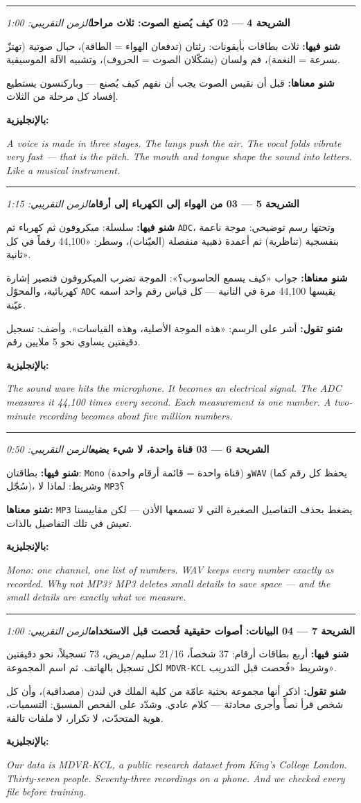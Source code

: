 \documentclass[12pt,a4paper]{article}
\newcommand{\E}[1]{\textenglish{\texttt{#1}}}
\newcommand{\N}[1]{\textenglish{#1}}
\newcommand{\slayd}[3]{%
  \par\vspace{10pt}\hrule\vspace{8pt}%
  {\large\textbf{الشريحة #1 — #2}}\hfill{\small\textit{الزمن التقريبي: #3}}\par\vspace{4pt}%
}
\newcommand{\fiha}{\textbf{شنو فيها: }}
\newcommand{\managementhaha}{\textbf{شنو معناها: }}
\newcommand{\tqul}{\textbf{شنو تقول: }}
\newcommand{\bilinglizi}[1]{\par\textbf{بالإنجليزية:}\par
  \begin{english}\small\itshape #1\end{english}\par}
\begin{document}
\slayd{\N{4}}{\N{02} كيف يُصنع الصوت: ثلاث مراحل}{\N{1:00}}
\fiha ثلاث بطاقات بأيقونات: رئتان (تدفعان الهواء = الطاقة)، حبال صوتية
(تهتزّ بسرعة = النغمة)، فم ولسان (يشكّلان الصوت = الحروف)، وتشبيه الآلة
الموسيقية.
\par\managementhaha قبل أن نقيس الصوت يجب أن نفهم كيف يُصنع — وباركنسون
يستطيع إفساد كل مرحلة من الثلاث.
\bilinglizi{A voice is made in three stages. The lungs push the air. The
vocal folds vibrate very fast --- that is the pitch. The mouth and
tongue shape the sound into letters. Like a musical instrument.}

\slayd{\N{5}}{\N{03} من الهواء إلى الكهرباء إلى أرقام}{\N{1:15}}
\fiha سلسلة: ميكروفون ثم كهرباء ثم \E{ADC}، وتحتها رسم توضيحي: موجة
ناعمة بنفسجية (تناظرية) ثم أعمدة ذهبية منفصلة (العيّنات)، وسطر:
«\N{44{,}100} رقماً في كل ثانية».
\par\managementhaha جواب «كيف يسمع الحاسوب؟»: الموجة تضرب الميكروفون
فتصير إشارة كهربائية، والمحوّل \E{ADC} يقيسها \N{44{,}100} مرة في
الثانية — كل قياس رقم واحد اسمه عيّنة.
\par\tqul أشر على الرسم: «هذه الموجة الأصلية، وهذه القياسات». وأضف:
تسجيل دقيقتين يساوي نحو \N{5} ملايين رقم.
\bilinglizi{The sound wave hits the microphone. It becomes an electrical
signal. The ADC measures it 44,100 times every second. Each measurement
is one number. A two-minute recording becomes about five million
numbers.}

\slayd{\N{6}}{\N{03} قناة واحدة، لا شيء يضيع}{\N{0:50}}
\fiha بطاقتان: \E{Mono} (قناة واحدة = قائمة أرقام واحدة) و\E{WAV}
(يحفظ كل رقم كما سُجّل)، وشريط: لماذا لا \E{MP3}؟
\par\managementhaha \E{MP3} يضغط بحذف التفاصيل الصغيرة التي لا تسمعها
الأذن — لكن مقاييسنا تعيش في تلك التفاصيل بالذات.
\bilinglizi{Mono: one channel, one list of numbers. WAV keeps every
number exactly as recorded. Why not MP3? MP3 deletes small details to
save space --- and the small details are exactly what we measure.}

\slayd{\N{7}}{\N{04} البيانات: أصوات حقيقية فُحصت قبل الاستخدام}{\N{1:00}}
\fiha أربع بطاقات أرقام: \N{37} شخصاً، \N{21}/\N{16} سليم/مريض،
\N{73} تسجيلاً، نحو دقيقتين لكل تسجيل بالهاتف. ثم اسم المجموعة
\E{MDVR-KCL} وشريط «فُحصت قبل التدريب».
\par\tqul اذكر أنها مجموعة بحثية عامّة من كلية الملك في لندن (مصداقية)،
وأن كل شخص قرأ نصاً وأجرى محادثة — كلام عادي. وشدّد على الفحص المسبق:
التسميات، هوية المتحدّث، لا تكرار، لا ملفات تالفة.
\bilinglizi{Our data is MDVR-KCL, a public research dataset from King's
College London. Thirty-seven people. Seventy-three recordings on a
phone. And we checked every file before training.}
\end{document}
